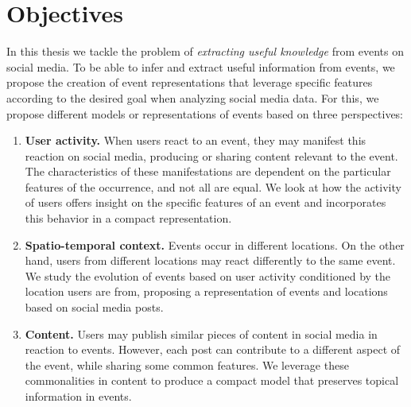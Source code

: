 

\section{Objectives}

In this thesis we tackle the problem of {\em extracting useful
knowledge} from events on social media. 
%
To be able to infer and extract useful information from events, we propose the
creation of event representations that leverage specific features according
to the desired goal when analyzing social media data.
%
For this, we propose different models or representations of events based on
three perspectives:
%

\begin{enumerate}
    \item {\bf User activity.} 
    When users react to an event, they may manifest this reaction on social
    media, producing or sharing content relevant to the event. 
    The characteristics of these manifestations are dependent on the particular
    features of the occurrence, and not all are equal. 
    We look at how the activity of users offers insight on the specific
    features of an event and incorporates this behavior in a compact
    representation.

    \item {\bf Spatio-temporal context.} 
    Events occur in different locations. 
    On the other hand, users from different locations may react differently to
    the same event.
    We study the evolution of events based on user activity conditioned by the
    location users are from, proposing a representation of events and locations
    based on social media posts.

    \item {\bf Content.} 
    Users may publish similar pieces of content in social media in reaction to
    events.
    However, each post can contribute to a different aspect of the event, while
    sharing some common features.
    We leverage these commonalities in content to produce a compact model that
    preserves topical information in events.
    
\end{enumerate}




